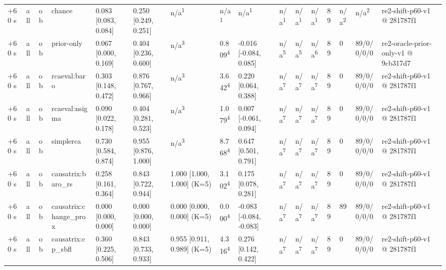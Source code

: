 \begin{table}[t]
\begin{tabular}{llllllllllllllll}
+60 s & all & ob & chance & 0.083 [0.083, 0.084] & 0.250 [0.249, 0.251] & n/a\textsuperscript{1} & n/a\textsuperscript{1} & n/a\textsuperscript{1} & n/a\textsuperscript{1} & n/a\textsuperscript{1} & n/a\textsuperscript{1} & 89 & n/a\textsuperscript{2} & n/a\textsuperscript{2} & re2-shift-p60-v1 @ 281787f1 \\
+60 s & all & ob & prior-only & 0.067 [0.000, 0.169] & 0.404 [0.236, 0.600] & n/a\textsuperscript{3} & 0.809\textsuperscript{4} & -0.016 [-0.084, 0.085] & n/a\textsuperscript{5} & n/a\textsuperscript{5} & n/a\textsuperscript{6} & 89 & 0 & 89/0/0/0/0 & re2-oracle-prior-only-v1 @ 9cb317d7 \\
+60 s & all & ob & rcaeval:baro & 0.303 [0.148, 0.472] & 0.876 [0.767, 0.966] & n/a\textsuperscript{3} & 3.642\textsuperscript{4} & 0.220 [0.064, 0.388] & n/a\textsuperscript{7} & n/a\textsuperscript{7} & n/a\textsuperscript{7} & 89 & 0 & 89/0/0/0/0 & re2-shift-p60-v1 @ 281787f1 \\
+60 s & all & ob & rcaeval:nsigma & 0.090 [0.022, 0.178] & 0.404 [0.281, 0.523] & n/a\textsuperscript{3} & 1.079\textsuperscript{4} & 0.007 [-0.061, 0.094] & n/a\textsuperscript{7} & n/a\textsuperscript{7} & n/a\textsuperscript{7} & 89 & 0 & 89/0/0/0/0 & re2-shift-p60-v1 @ 281787f1 \\
+60 s & all & ob & simplerca & 0.730 [0.584, 0.874] & 0.955 [0.876, 1.000] & n/a\textsuperscript{3} & 8.768\textsuperscript{4} & 0.647 [0.501, 0.791] & n/a\textsuperscript{7} & n/a\textsuperscript{7} & n/a\textsuperscript{7} & 89 & 0 & 89/0/0/0/0 & re2-shift-p60-v1 @ 281787f1 \\
+60 s & all & ob & causatrix:baro\_rs & 0.258 [0.161, 0.364] & 0.843 [0.722, 0.944] & 1.000 [1.000, 1.000] (K=5) & 3.102\textsuperscript{4} & 0.175 [0.078, 0.281] & n/a\textsuperscript{7} & n/a\textsuperscript{7} & n/a\textsuperscript{7} & 89 & 0 & 89/0/0/0/0 & re2-shift-p60-v1 @ 281787f1 \\
+60 s & all & ob & causatrix:change\_prox & 0.000 [0.000, 0.000] & 0.000 [0.000, 0.000] & 0.000 [0.000, 0.000] (K=5) & 0.000\textsuperscript{4} & -0.083 [-0.084, -0.083] & n/a\textsuperscript{7} & n/a\textsuperscript{7} & n/a\textsuperscript{7} & 89 & 89 & 89/0/0/0/0 & re2-shift-p60-v1 @ 281787f1 \\
+60 s & all & ob & causatrix:cp\_sbfl & 0.360 [0.225, 0.506] & 0.843 [0.733, 0.933] & 0.955 [0.911, 0.989] (K=5) & 4.316\textsuperscript{4} & 0.276 [0.142, 0.422] & n/a\textsuperscript{7} & n/a\textsuperscript{7} & n/a\textsuperscript{7} & 89 & 0 & 89/0/0/0/0 & re2-shift-p60-v1 @ 281787f1 \\

\end{tabular}
\end{table}
